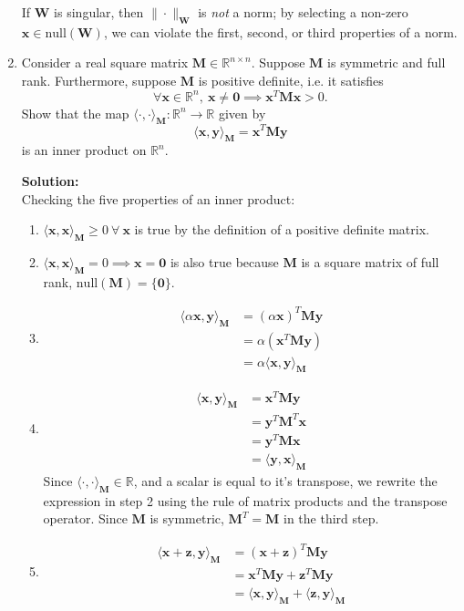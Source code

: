 \documentclass[]{article}
\newcommand{\R}{\mathbb{R}}				%
\newcommand{\x}{\bm{x}}					%
\newcommand{\y}{\bm{y}}					%
\newcommand{\z}{\bm{z}}					%
\newcommand{\vnull}{\mathrm{null}}		%
\newcommand{\la}{\langle}				%
\newcommand{\ra}{\rangle}				%
\newcommand{\solution}{\vskip 0.5cm \textbf{\large Solution:} \\}
\begin{document}
\begin{enumerate}[resume]
      If $\bm{W}$ is singular, then $\|\cdot\|_{\bm{W}}$ is {\em not}
      a norm; by selecting a non-zero $\x \in \vnull(\bm{W})$, we can
      violate the first, second, or third properties of a norm.

	\item Consider a real square matrix $\bm{M}\in\R^{n\times
      n}$. Suppose $\bm{M}$ is symmetric and full rank. Furthermore,
      suppose $\bm{M}$ is positive definite, i.e. it satisfies
	  \[
	  \forall\x\in\R^n,~\x\neq\bm{0}\implies \x^T\bm{Mx}>0.
	  \]
	  Show that the map $\la\cdot,\cdot\ra_{\bm{M}}:\R^n\to\R$ given by
	  \[
	  \la \x,\y\ra_{\bm{M}} =\x^T\bm{My}
	  \]
	  is an inner product on $\R^n$.

	  \solution Checking the five properties of an inner product:
      \begin{enumerate}
      \item $\la \x,\x\ra_{\bm{M}} \geq 0~\forall~\x$ is true by the
        definition of a positive definite matrix.

      \item $\la \x,\x\ra_{\bm{M}} = 0 \implies \x = \bm{0}$ is also
        true because $\bm{M}$ is a square matrix of full rank,
        $\vnull(\bm{M}) = \{\bm{0}\}$.

      \item
        \[\begin{split}
        \la \alpha \x,\y\ra_{\bm{M}} &= (\alpha\x)^T\bm{My} \\
        &= \alpha(\x^T\bm{My}) \\
        &= \alpha \la \x,\y\ra_{\bm{M}}
        \end{split}\]
        
      \item
        \[\begin{split}
        \la \x,\y\ra_{\bm{M}} &= \x^T\bm{My} \\
        &= \y^T\bm{M}^T\x \\
        &= \y^T\bm{M}\x \\
        &= \la \y,\x\ra_{\bm{M}}
        \end{split}\]
        Since $\la \cdot,\cdot\ra_{\bm{M}} \in \R$, and a scalar is equal to
        it's transpose, we rewrite the expression in step 2 using the
        rule of matrix products and the transpose operator.  Since
        $\bm{M}$ is symmetric, $\bm{M}^T = \bm{M}$ in the third step.
        
      \item
        \[\begin{split}
        \la \x + \z,\y\ra_{\bm{M}} &= (\x + \z)^T\bm{My} \\
        &= \x^T\bm{My} + \z^T\bm{My} \\
        &= \la \x,\y\ra_{\bm{M}} + \la \z,\y\ra_{\bm{M}}
        \end{split}\]
      \end{enumerate}


\end{enumerate}
\end{document}
